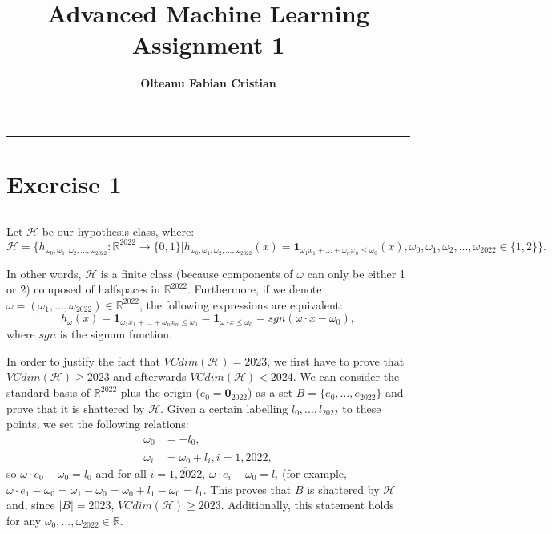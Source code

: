 \documentclass{article}
\author{\textbf{Olteanu Fabian Cristian}}
\affil{FMI, AI Master, Year 1
}
\title{\textbf{\huge Advanced Machine Learning Assignment 1}}
\date{}
\begin{document}
\pagestyle{headings}	
\newpage
\setcounter{page}{1}
\renewcommand{\thepage}{\arabic{page}}


	
	
\setlength{\parskip}{0.5em}
	
\maketitle
	
\noindent\rule{15cm}{0.4pt}
\renewcommand{\thesubsection}{\thesection.\alph{subsection}}

\section{Exercise 1}
\subsection{}
Let $\mathcal{H}$ be our hypothesis class, where:
$
\mathcal{H}=\{h_{\omega_0, \omega_1,\omega_2,...,\omega_{2022}}:\mathbb{R}^{2022} \rightarrow \{0,1\}|h_{\omega_0, \omega_1,\omega_2,...,\omega_{2022}}(x) = \mathbf{1}_{\omega_1x_1 + ... + \omega_nx_n \leq \omega_0}(x), \omega_0,\omega_1,\omega_2,...,\omega_{2022}\in \{1,2\}\}.
$

In other words, $\mathcal{H}$ is a finite class (because components of $\omega$ can only be either 1 or 2) composed of halfspaces in $\mathbb{R}^{2022}$. Furthermore, if we denote $\omega=(\omega_1,...,\omega_{2022})\in \mathbb{R}^{2022}$, the following expressions are equivalent: 
$$
h_\omega(x)=\mathbf{1}_{\omega_1x_1 + ... + \omega_nx_n \leq \omega_0}=\mathbf{1}_{\omega \cdot x \leq \omega_0}=sgn(\omega \cdot x - \omega_0),
$$ where $sgn$ is the signum function.

In order to justify the fact that $VCdim(\mathcal{H})=2023$, we first have to prove that $VCdim(\mathcal{H})\geq2023$ and afterwards $VCdim(\mathcal{H})<2024$. We can consider the standard basis of $\mathbb{R}^{2022}$ plus the origin ($e_0=\mathbf{0}_{2022}$) as a set $B=\{e_0,...,e_{2022}\}$ and prove that it is shattered by $\mathcal{H}$. Given a certain labelling $l_0,...,l_{2022}$ to these points, we set the following relations:
\begin{align*}
\omega_0 &= -l_0, \\
\omega_i &= \omega_0 + l_i, i=\overline{1,2022},
\end{align*}
so $\omega \cdot e_0 - \omega_0=l_0$ and for all $i=\overline{1,2022}$, $\omega \cdot e_i - \omega_0 = l_i$ (for example, $\omega \cdot e_1 - \omega_0 = \omega_1 - \omega_0 = \omega_0 + l_1 - \omega_0 = l_1$. This proves that $B$ is shattered by $\mathcal{H}$ and, since $|B|=2023$, $VCdim(\mathcal{H}) \geq 2023$. Additionally, this statement holds for any $\omega_0,...,\omega_{2022} \in \mathbb{R}$.
\end{document}
